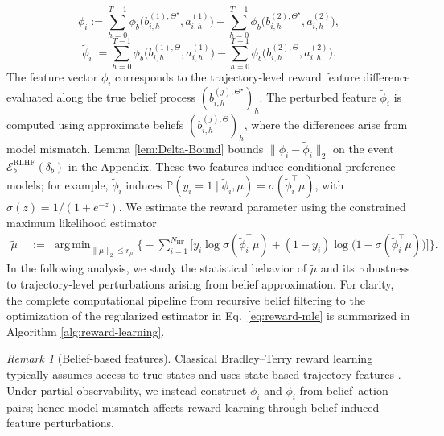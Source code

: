 \documentclass[10pt]{article} %
\DeclareMathOperator*{\argmin}{arg\,min}
\theoremstyle{plain}
\theoremstyle{definition}
\theoremstyle{remark}
\newtheorem{remark}[theorem]{Remark}
\newcommand{\bP}{\mathbb{P}}
\begin{document}
\begin{equation}\label{eq:accu-feature-exact}
\phi_i:=\sum_{h=0}^{T-1}\phi_b \bigl(b_{i,h}^{(1),\Theta^\star},a_{i,h}^{(1)}\bigr)-\sum_{h=0}^{T-1}\phi_b \bigl(b_{i,h}^{(2),\Theta^\star},a_{i,h}^{(2)}\bigr),
\end{equation}
\begin{equation}\label{eq:accu-feature-perturbed}
\tilde\phi_i:=\sum_{h=0}^{T-1} \phi_b \bigl(b_{i,h}^{(1),\Theta}, a_{i,h}^{(1)}\bigr)
-\sum_{h=0}^{T-1} \phi_b \bigl(b_{i,h}^{(2),\Theta}, a_{i,h}^{(2)}\bigr).
\end{equation}
The feature vector $\phi_i$ corresponds to the trajectory-level reward feature difference evaluated along the true belief process $(b_{i,h}^{(j),\Theta^\star})_{h}$.
The perturbed feature $\tilde\phi_i$ is computed using approximate beliefs $(b_{i,h}^{(j),\Theta})_{h}$, where the differences arise from model mismatch. Lemma \ref{lem:Delta-Bound} bounds  $\|\phi_i-\tilde\phi_i\|_2$ on the event $\mathcal E_{b}^{\mathrm{RLHF}}(\delta_b)$ in the Appendix. These two features induce conditional preference models; for example,
\(
\tilde\phi_i
\)
induces
\(
\bP(y_i=1\mid \tilde\phi_i,\mu)=\sigma(\tilde\phi_i^\top\mu)
\),
with $\sigma(z)=1/(1+e^{-z})$.
We estimate the reward parameter using the constrained maximum likelihood estimator
\begin{align}\label{eq:reward-mle}
\tilde\mu\;&:=\;\argmin_{\|\mu\|_2\le r_\mu}\Bigg\{-\sum_{i=1}^{N_{\mathrm{HF}}}\Big[y_i\log\sigma(\tilde\phi_i^\top\mu)
+(1-y_i)\log \bigl(1-\sigma(\tilde\phi_i^\top\mu)\bigr)\Big]\Bigg\}.
\end{align}
In the following analysis, we study the statistical behavior of $\tilde\mu$ and its robustness to trajectory-level perturbations arising from belief approximation. For clarity, the complete computational pipeline from recursive belief filtering to the optimization of the regularized estimator in Eq.~\ref{eq:reward-mle} is summarized in Algorithm \ref{alg:reward-learning}.

\begin{remark}[Belief-based features]
Classical Bradley--Terry reward learning typically assumes access to true states and uses state-based trajectory features \citep{Wirth2017, ZhuPrincipledComparisons, Du2019, cen2025valueincentivized}. Under partial observability, we instead construct $\phi_i$ and $\tilde\phi_i$ from belief--action pairs; hence model mismatch affects reward learning through belief-induced feature perturbations.
\end{remark}
\end{document}
